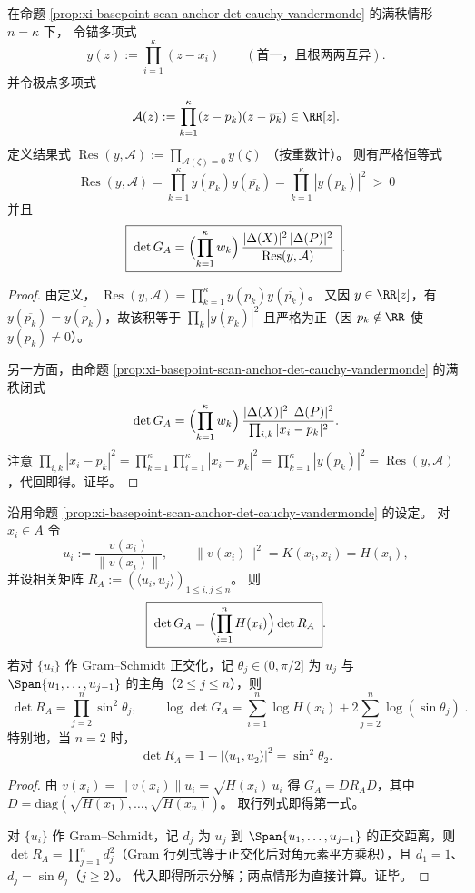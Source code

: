 \begin{corollary}\label{cor:xi-basepoint-scan-anchor-det-resultant}
在命题 \ref{prop:xi-basepoint-scan-anchor-det-cauchy-vandermonde} 的满秩情形 \(n=\kappa\) 下，
令锚多项式
\[
y(z):=\prod_{i=1}^{\kappa}(z-x_i)
\qquad(\text{首一，且根两两互异}).
\]
并令极点多项式
\[
\mathcal{A}(z):=\prod_{k=1}^{\kappa}(z-p_k)(z-\overline{p_k})\in\RR[z].
\]
定义结果式
\(
\operatorname{Res}(y,\mathcal{A}):=\prod_{\mathcal{A}(\zeta)=0}y(\zeta)
\)
（按重数计）。
则有严格恒等式
\[
\boxed{\;
\operatorname{Res}(y,\mathcal{A})
=\prod_{k=1}^{\kappa}y(p_k)y(\overline{p_k})
=\prod_{k=1}^{\kappa}|y(p_k)|^{2}\ >\ 0\;}
\]
并且
\[
\boxed{\;
\det G_A
=\Bigl(\prod_{k=1}^{\kappa}w_k\Bigr)\,
\frac{|\Delta(X)|^2\,|\Delta(P)|^2}{\operatorname{Res}(y,\mathcal{A})}\; }.
\]
\end{corollary}
\begin{proof}
由定义，
\(
\operatorname{Res}(y,\mathcal{A})
=\prod_{k=1}^{\kappa}y(p_k)y(\overline{p_k})
\)。
又因 \(y\in\RR[z]\)，有 \(y(\overline{p_k})=\overline{y(p_k)}\)，故该积等于 \(\prod_k|y(p_k)|^2\) 且严格为正（因 \(p_k\notin\RR\) 使 \(y(p_k)\ne 0\)）。
\par
另一方面，由命题 \ref{prop:xi-basepoint-scan-anchor-det-cauchy-vandermonde} 的满秩闭式
\[
\det G_A=\Bigl(\prod_{k=1}^{\kappa}w_k\Bigr)\,
\frac{|\Delta(X)|^2\,|\Delta(P)|^2}{\prod_{i,k}|x_i-p_k|^2}.
\]
注意
\(
\prod_{i,k}|x_i-p_k|^2
=\prod_{k=1}^{\kappa}\prod_{i=1}^{\kappa}|x_i-p_k|^2
=\prod_{k=1}^{\kappa}|y(p_k)|^2
=\operatorname{Res}(y,\mathcal{A})
\)，代回即得。证毕。
\end{proof}

\begin{proposition}\label{prop:xi-basepoint-scan-anchor-principal-angles}
沿用命题 \ref{prop:xi-basepoint-scan-anchor-det-cauchy-vandermonde} 的设定。
对 \(x_i\in A\) 令
\[
u_i:=\frac{v(x_i)}{\|v(x_i)\|},\qquad
\|v(x_i)\|^2=K(x_i,x_i)=H(x_i),
\]
并设相关矩阵 \(R_A:=(\langle u_i,u_j\rangle)_{1\le i,j\le n}\)。
则
\[
\boxed{\;
\det G_A=\Bigl(\prod_{i=1}^{n}H(x_i)\Bigr)\det R_A\; }.
\]
若对 \(\{u_i\}\) 作 Gram--Schmidt 正交化，记 \(\theta_j\in(0,\pi/2]\) 为 \(u_j\) 与 \(\Span\{u_1,\dots,u_{j-1}\}\) 的主角（\(2\le j\le n\)），则
\[
\boxed{\;
\det R_A=\prod_{j=2}^{n}\sin^2\theta_j,\qquad
\log\det G_A=\sum_{i=1}^{n}\log H(x_i)+2\sum_{j=2}^{n}\log(\sin\theta_j)\; }.
\]
特别地，当 \(n=2\) 时，
\[
\det R_A=1-|\langle u_1,u_2\rangle|^2=\sin^2\theta_2.
\]
\end{proposition}
\begin{proof}
由 \(v(x_i)=\|v(x_i)\|u_i=\sqrt{H(x_i)}\,u_i\) 得 \(G_A=DR_AD\)，其中 \(D=\mathrm{diag}(\sqrt{H(x_1)},\dots,\sqrt{H(x_n)})\)。
取行列式即得第一式。
\par
对 \(\{u_i\}\) 作 Gram--Schmidt，记 \(d_j\) 为 \(u_j\) 到 \(\Span\{u_1,\dots,u_{j-1}\}\) 的正交距离，则 \(\det R_A=\prod_{j=1}^{n}d_j^2\)（Gram 行列式等于正交化后对角元素平方乘积），且 \(d_1=1\)、\(d_j=\sin\theta_j\)（\(j\ge 2\)）。
代入即得所示分解；两点情形为直接计算。证毕。
\end{proof}

